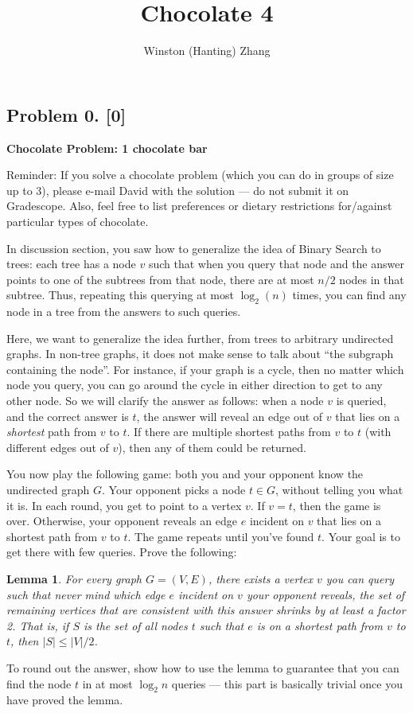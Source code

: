 \documentclass[10pt]{article}
\title{\bf Chocolate 4}
\author{Winston (Hanting) Zhang}
\newtheorem{lemma}{Lemma}
\begin{document}
\maketitle

\subsection*{Problem 0. [0]}
\textbf{Chocolate Problem: 1 chocolate bar}

Reminder: If you solve a chocolate problem (which you can do in groups of size up to 3), please e-mail David with the solution --- do not submit it on Gradescope. Also, feel free to list preferences or dietary restrictions for/against particular types of chocolate.

In discussion section, you saw how to generalize the idea of Binary Search to trees: each tree has a node $v$ such that when you query that node and the answer points to one of the subtrees from that node, there are at most $n/2$ nodes in that subtree. Thus, repeating this querying at most $\log_2 (n)$ times, you can find any node in a tree from the answers to such queries.

Here, we want to generalize the idea further, from trees to arbitrary undirected graphs. In non-tree graphs, it does not make sense to talk about ``the subgraph containing the node''. For instance, if your graph is a cycle, then no matter which node you query, you can go around the cycle in either direction to get to any other node. So we will clarify the answer as follows: when a node $v$ is queried, and the correct answer is $t$, the answer will reveal an edge out of $v$ that lies on a \emph{shortest} path from $v$ to $t$. If there are multiple shortest paths from $v$ to $t$ (with different edges out of $v$), then any of them could be returned.

You now play the following game: both you and your opponent know the undirected graph $G$. Your opponent picks a node $t \in G$, without telling you what it is. In each round, you get to point to a vertex $v$. If $v=t$, then the game is over. Otherwise, your opponent reveals an edge $e$ incident on $v$ that lies on a shortest path from $v$ to $t$. The game repeats until you've found $t$. Your goal is to get there with few queries.
Prove the following:

\begin{lemma} \label{lem:median}
  For every graph $G=(V,E)$, there exists a vertex $v$ you can query such that never mind which edge $e$ incident on $v$ your opponent reveals, the set of remaining vertices that are consistent with this answer shrinks by at least a factor 2. That is, if $S$ is the set of all nodes $t$ such that $e$ is on a shortest path from $v$ to $t$, then $|S| \leq |V|/2$.
\end{lemma}

To round out the answer, show how to use the lemma to guarantee that you can find the node $t$ in at most $\log_2 n$ queries --- this part is basically trivial once you have proved the lemma.
\end{document}
